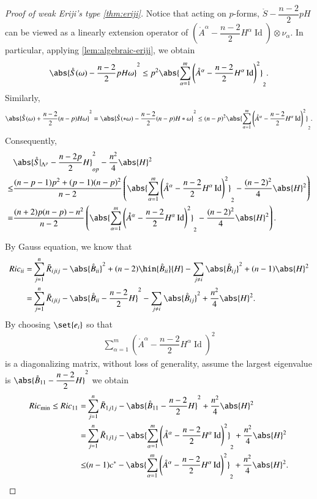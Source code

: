 \documentclass[12pt]{amsart}
\theoremstyle{plain}
\theoremstyle{remark}
\theoremstyle{definition}
\numberwithin{equation}{section}
\begin{document}
\begin{proof}[Proof of weak Eriji's type \autoref{thm:eriji}]
Notice that acting on $p$-forms, $\mathring{S}-\dfrac{n-2}{2}pH$ can be viewed as a linearly extension operator of $\left(\mathring{A}^{\alpha}-\dfrac{n-2}{2}H^{\alpha}\operatorname{Id}\right)\otimes\nu_{\alpha}$. In particular, applying \autoref{lem:algebraic-eriji}, we obtain
\begin{align*}
\abs{\mathring{S}(\omega)-\dfrac{n-2}{2}pH\omega}^2\leq p^2\abs{\sum_{\alpha=1}^m\left(\mathring{A}^{\alpha}-\dfrac{n-2}{2}H^{\alpha}\operatorname{Id}\right)^2}_2.
\end{align*}
Similarly,
\begin{align*}
\abs{\mathring{S}(\omega)+\dfrac{n-2}{2}(n-p)H\omega}^2=\abs{\mathring{S}(*\omega)-\dfrac{n-2}{2}(n-p)H*\omega}^2\leq (n-p)^2\abs{\sum_{\alpha=1}^m\left(\mathring{A}^{\alpha}-\dfrac{n-2}{2}H^{\alpha}\operatorname{Id}\right)^2}_2.
\end{align*}
Consequently,
\begin{align*}
&\abs{\mathring{S}\vert_{\Lambda^p}-\dfrac{n-2p}{2}H}_{op}^2-\dfrac{n^2}{4}\abs{H}^2\\
\leq&\dfrac{(n-p-1)p^2+(p-1)(n-p)^2}{n-2}\left(\abs{\sum_{\alpha=1}^m\left(\mathring{A}^{\alpha}-\dfrac{n-2}{2}H^{\alpha}\operatorname{Id}\right)^2}_2-\dfrac{(n-2)^2}{4}\abs{H}^2\right)\\
=&\dfrac{(n+2)p(n-p)-n^2}{n-2}\left(\abs{\sum_{\alpha=1}^m\left(\mathring{A}^{\alpha}-\dfrac{n-2}{2}H^{\alpha}\operatorname{Id}\right)^2}_2-\dfrac{(n-2)^2}{4}\abs{H}^2\right).
\end{align*}

By Gauss equation, we know that
\begin{align*}
Ric_{ii}=&\sum_{j=1}^n\bar R_{ijij}-\abs{\mathring{B}_{ii}}^2+(n-2)\hin{\mathring{B}_{ii}}{H}-\sum_{j\neq i}\abs{\mathring{B}_{ij}}^2+(n-1)\abs{H}^2\\
=&\sum_{j=1}^n\bar R_{ijij}-\abs{\mathring{B}_{ii}-\dfrac{n-2}{2}H}^2-\sum_{j\neq i}\abs{\mathring{B}_{ij}}^2+\dfrac{n^2}{4}\abs{H}^2.
\end{align*}
By choosing $\set{e_i}$ so that
\begin{align*}
\sum_{\alpha=1}^m\left(\mathring{A}^{\alpha}-\dfrac{n-2}{2}H^{\alpha}\operatorname{Id}\right)^2
\end{align*}
is a diagonalizing matrix, without loss of generality, assume the largest eigenvalue is $\abs{\mathring{B}_{11}-\dfrac{n-2}{2}H}^2$ we obtain
\begin{align*}
Ric_{\min}\leq Ric_{11}=&\sum_{j=1}^n\bar R_{1j1j}-\abs{\mathring{B}_{11}-\dfrac{n-2}{2}H}^2+\dfrac{n^2}{4}\abs{H}^2\\
=&\sum_{j=1}^n\bar R_{1j1j}-\abs{\sum_{\alpha=1}^m\left(\mathring{A}^{\alpha}-\dfrac{n-2}{2}H^{\alpha}\operatorname{Id}\right)^2}_2+\dfrac{n^2}{4}\abs{H}^2\\
\leq&(n-1)c^*-\abs{\sum_{\alpha=1}^m\left(\mathring{A}^{\alpha}-\dfrac{n-2}{2}H^{\alpha}\operatorname{Id}\right)^2}_2+\dfrac{n^2}{4}\abs{H}^2.
\end{align*}


\end{proof}
\end{document}
